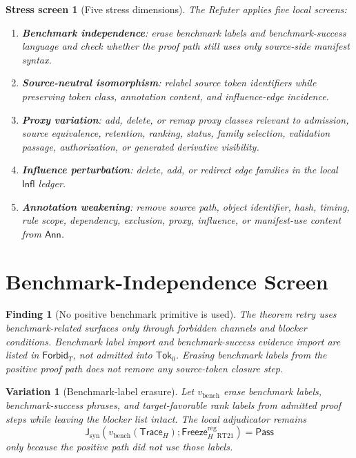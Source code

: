 \documentclass[11pt]{article}
\newcommand{\SrcTok}{\mathsf{Tok}_{0}}
\newcommand{\ForbidT}{\mathsf{Forbid}_{T}}
\newcommand{\TraceH}{\mathsf{Trace}_{H}}
\newcommand{\Annot}{\mathsf{Ann}}
\newcommand{\Influence}{\mathsf{Infl}}
\newcommand{\FreezeH}{\mathsf{Freeze}_{H}}
\newcommand{\JudgeSyn}{\mathsf{J}_{\mathrm{syn}}}
\newcommand{\Pass}{\mathsf{Pass}}
\newtheorem{screen}{Stress screen}
\newtheorem{finding}{Finding}
\newtheorem{variant}{Variation}
\begin{document}
\begin{screen}[Five stress dimensions]
The Refuter applies five local screens:
\begin{enumerate}
    \item \textbf{Benchmark independence}: erase benchmark labels and
    benchmark-success language and check whether the proof path still uses
    only source-side manifest syntax.
    \item \textbf{Source-neutral isomorphism}: relabel source token
    identifiers while preserving token class, annotation content, and
    influence-edge incidence.
    \item \textbf{Proxy variation}: add, delete, or remap proxy classes
    relevant to admission, source equivalence, retention, ranking, status,
    family selection, validation passage, authorization, or generated
    derivative visibility.
    \item \textbf{Influence perturbation}: delete, add, or redirect edge
    families in the local \(\Influence\) ledger.
    \item \textbf{Annotation weakening}: remove source path, object
    identifier, hash, timing, rule scope, dependency, exclusion, proxy,
    influence, or manifest-use content from \(\Annot\).
\end{enumerate}
\end{screen}

\section{Benchmark-Independence Screen}

\begin{finding}[No positive benchmark primitive is used]
The theorem retry uses benchmark-related surfaces only through forbidden
channels and blocker conditions. Benchmark label import and
benchmark-success evidence import are listed in \(\ForbidT\), not admitted
into \(\SrcTok\). Erasing benchmark labels from the positive proof path
does not remove any source-token closure step.
\end{finding}

\begin{variant}[Benchmark-label erasure]
Let \(v_{\mathrm{bench}}\) erase benchmark labels, benchmark-success
phrases, and target-favorable rank labels from admitted proof steps while
leaving the blocker list intact. The local adjudicator remains
\[
    \JudgeSyn(v_{\mathrm{bench}}(\TraceH);
    \FreezeH^{\mathrm{reg}}_{\mathrm{RT21}})=\Pass
\]
only because the positive path did not use those labels.
\end{variant}
\end{document}
